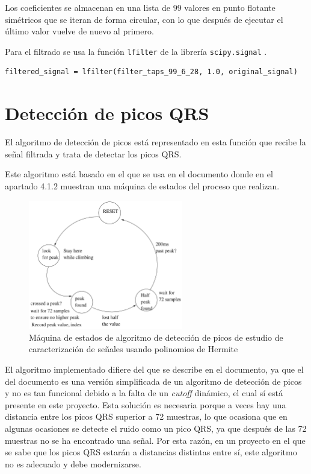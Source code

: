 Los coeficientes se almacenan en una lista de 99 valores en punto flotante simétricos que se iteran de forma circular, con lo que después de ejecutar el último valor vuelve de nuevo al primero.  

Para el filtrado se usa la función \lstinline{lfilter} de la librería \lstinline{scipy.signal} \cite{SciPy}.

\lstset{language=python, breaklines=true, basicstyle=\footnotesize}
\begin{lstlisting}[frame=single]
    filtered_signal = lfilter(filter_taps_99_6_28, 1.0, original_signal)
\end{lstlisting}

\section{Detección de picos QRS}

El algoritmo de detección de picos está representado en esta función que recibe la señal filtrada y trata de detectar los picos QRS.

Este algoritmo está basado en el que se usa en el documento \cite{desai2021low} donde en el apartado 4.1.2 muestran una máquina de estados del proceso que realizan.

\begin{figure}[h!]
    \centering
    \includegraphics[width=0.6\textwidth]{./Images/img_algoritmo/fsm_mdpi.png}
    \caption{Máquina de estados de algoritmo de detección de picos de estudio de caracterización de señales usando polinomios de Hermite \cite{desai2021low}}
    \label{fig:fsm_mpdi}
\end{figure}

El algoritmo implementado difiere del que se describe en el documento, ya que el del documento es una versión simplificada de un algoritmo de detección de picos y no es tan funcional debido a la falta de un \textit{cutoff} dinámico, el cual sí está presente en este proyecto. Esta solución es necesaria porque a veces hay una distancia entre los picos QRS superior a 72 muestras, lo que ocasiona que en algunas ocasiones se detecte el ruido como un pico QRS, ya que después de las 72 muestras no se ha encontrado una señal. Por esta razón, en un proyecto en el que se sabe que los picos QRS estarán a distancias distintas entre sí, este algoritmo no es adecuado y debe modernizarse.

